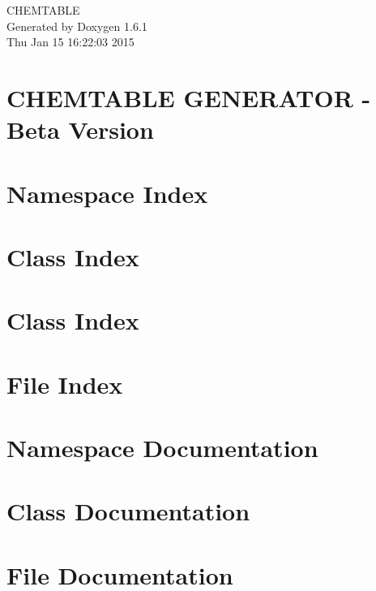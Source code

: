 \documentclass[a4paper]{book}
\begin{document}
\hypersetup{pageanchor=false}
\begin{titlepage}
\vspace*{7cm}
\begin{center}
{\Large CHEMTABLE }\\
\vspace*{1cm}
{\large Generated by Doxygen 1.6.1}\\
\vspace*{0.5cm}
{\small Thu Jan 15 16:22:03 2015}\\
\end{center}
\end{titlepage}
\clearemptydoublepage
{}
\tableofcontents
\clearemptydoublepage
{}
\hypersetup{pageanchor=true}
\chapter{CHEMTABLE GENERATOR -\/ Beta Version}
\label{index}\hypertarget{index}{}
\chapter{Namespace Index}

\chapter{Class Index}

\chapter{Class Index}

\chapter{File Index}

\chapter{Namespace Documentation}




\chapter{Class Documentation}




























\chapter{File Documentation}


\printindex
\end{document}
